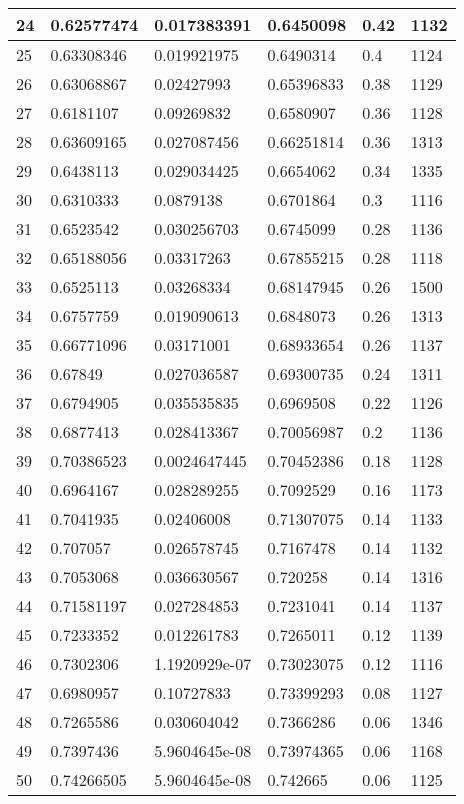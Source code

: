 \begin{longtable}{|l|l|l|l|l|l|}
24 & 0.62577474 & 0.017383391 & 0.6450098 & 0.42 & 1132 \\ \hline 
25 & 0.63308346 & 0.019921975 & 0.6490314 & 0.4 & 1124 \\ \hline 
26 & 0.63068867 & 0.02427993 & 0.65396833 & 0.38 & 1129 \\ \hline 
27 & 0.6181107 & 0.09269832 & 0.6580907 & 0.36 & 1128 \\ \hline 
28 & 0.63609165 & 0.027087456 & 0.66251814 & 0.36 & 1313 \\ \hline 
29 & 0.6438113 & 0.029034425 & 0.6654062 & 0.34 & 1335 \\ \hline 
30 & 0.6310333 & 0.0879138 & 0.6701864 & 0.3 & 1116 \\ \hline 
31 & 0.6523542 & 0.030256703 & 0.6745099 & 0.28 & 1136 \\ \hline 
32 & 0.65188056 & 0.03317263 & 0.67855215 & 0.28 & 1118 \\ \hline 
33 & 0.6525113 & 0.03268334 & 0.68147945 & 0.26 & 1500 \\ \hline 
34 & 0.6757759 & 0.019090613 & 0.6848073 & 0.26 & 1313 \\ \hline 
35 & 0.66771096 & 0.03171001 & 0.68933654 & 0.26 & 1137 \\ \hline 
36 & 0.67849 & 0.027036587 & 0.69300735 & 0.24 & 1311 \\ \hline 
37 & 0.6794905 & 0.035535835 & 0.6969508 & 0.22 & 1126 \\ \hline 
38 & 0.6877413 & 0.028413367 & 0.70056987 & 0.2 & 1136 \\ \hline 
39 & 0.70386523 & 0.0024647445 & 0.70452386 & 0.18 & 1128 \\ \hline 
40 & 0.6964167 & 0.028289255 & 0.7092529 & 0.16 & 1173 \\ \hline 
41 & 0.7041935 & 0.02406008 & 0.71307075 & 0.14 & 1133 \\ \hline 
42 & 0.707057 & 0.026578745 & 0.7167478 & 0.14 & 1132 \\ \hline 
43 & 0.7053068 & 0.036630567 & 0.720258 & 0.14 & 1316 \\ \hline 
44 & 0.71581197 & 0.027284853 & 0.7231041 & 0.14 & 1137 \\ \hline 
45 & 0.7233352 & 0.012261783 & 0.7265011 & 0.12 & 1139 \\ \hline 
46 & 0.7302306 & 1.1920929e-07 & 0.73023075 & 0.12 & 1116 \\ \hline 
47 & 0.6980957 & 0.10727833 & 0.73399293 & 0.08 & 1127 \\ \hline 
48 & 0.7265586 & 0.030604042 & 0.7366286 & 0.06 & 1346 \\ \hline 
49 & 0.7397436 & 5.9604645e-08 & 0.73974365 & 0.06 & 1168 \\ \hline 
50 & 0.74266505 & 5.9604645e-08 & 0.742665 & 0.06 & 1125 \\ \hline 
\end{longtable}